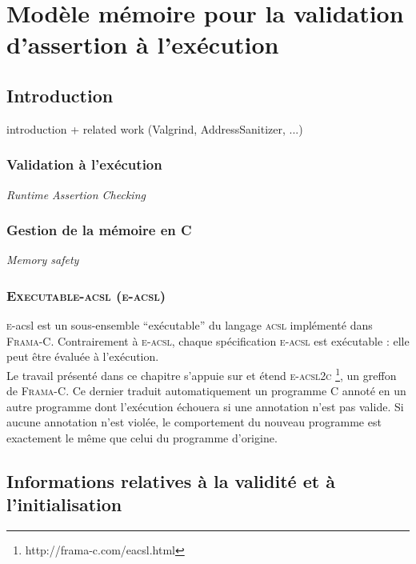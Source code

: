 
\chapter{Modèle mémoire pour la validation d'assertion à l'exécution}




\section{Introduction}
introduction + related work (Valgrind, AddressSanitizer, ...)

\subsection{Validation à l'exécution}

{\em Runtime Assertion Checking}

\subsection{Gestion de la mémoire en C}

{\em Memory safety}

\subsection{\textsc{Executable-acsl} (\textsc{e-acsl})}

{\textsc e-acsl} est un sous-ensemble ``exécutable'' du langage \textsc{acsl}
implémenté dans \textsc{Frama-C}. Contrairement à \textsc{e-acsl}, chaque
spécification \textsc{e-acsl} est exécutable : elle peut être évaluée à
l'exécution.\\

Le travail présenté dans ce chapitre s'appuie sur et étend \textsc{e-acsl2c}
\footnote{http://frama-c.com/eacsl.html}, un greffon de \textsc{Frama-C}. Ce
dernier traduit automatiquement un programme C annoté en un autre programme dont
l'exécution échouera si une annotation n'est pas valide. Si aucune annotation
n'est violée, le comportement du nouveau programme est exactement le même que
celui du programme d'origine.








\section{Informations relatives à la validité et à l'initialisation}


